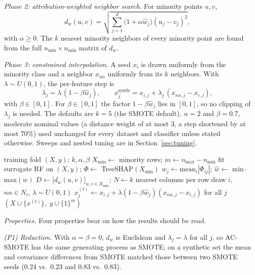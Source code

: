 \documentclass[conference,a4paper]{IEEEtran}
\newcommand{\acs}{AC-SMOTE}
\begin{document}
\textit{Phase 2: attribution-weighted neighbor search.} For minority points $u,v$,
\begin{equation}
d_w(u,v)=\sqrt{\sum_{j=1}^{d}\bigl(1+\alpha\hat{w}_j\bigr)(u_j-v_j)^2},
\end{equation}
with $\alpha\ge 0$. The $k$ nearest minority neighbors of every minority point are found from the full $n_{\min}\times n_{\min}$ matrix of $d_w$.

\textit{Phase 3: constrained interpolation.} A seed $x_i$ is drawn uniformly from the minority class and a neighbor $x_{nn}$ uniformly from its $k$ neighbors. With $\lambda\sim U(0,1)$, the per-feature step is
\begin{equation}
\lambda_j=\lambda\,(1-\beta\hat{w}_j),\qquad x^{\mathrm{synth}}_j=x_{i,j}+\lambda_j\,(x_{nn,j}-x_{i,j}),
\end{equation}
with $\beta\in[0,1]$. For $\beta\in[0,1]$ the factor $1-\beta\hat{w}_j$ lies in $[0,1]$, so no clipping of $\lambda_j$ is needed. The defaults are $k=5$ (the SMOTE default), $\alpha=2$ and $\beta=0.7$, moderate nominal values (a distance weight of at most 3, a step shortened by at most 70\%) used unchanged for every dataset and classifier unless stated otherwise. Sweeps and nested tuning are in Section~\ref{sec:tuning}.

\begin{algorithm}[t]\small
\caption{AC-SMOTE}\label{alg:acs}
\begin{algorithmic}[1]
\REQUIRE training fold $(X,y)$; $k,\alpha,\beta$
\STATE $X_{\min}\leftarrow$ minority rows; $m\leftarrow n_{\max}-n_{\min}$
\STATE fit surrogate RF on $(X,y)$; $\Phi\leftarrow$ TreeSHAP$(X_{\min})$
\STATE $w_j\leftarrow \mathrm{mean}_i|\Phi_{ij}|$; $\hat{w}\leftarrow$ min--max$(w)$
\STATE $D\leftarrow \big[d_w(u,v)\big]_{u,v\in X_{\min}}$; $N\leftarrow k$ nearest columns per row
\STATE draw $i$, $nn\in N_i$, $\lambda\sim U(0,1)$
\STATE $x^{(t)}_j\leftarrow x_{i,j}+\lambda(1-\beta\hat{w}_j)(x_{nn,j}-x_{i,j})$ for all $j$
\ENDFOR
\RETURN $(X\cup\{x^{(t)}\},\; y\cup\{1\}^m)$
\end{algorithmic}
\end{algorithm}

\textit{Properties.} Four properties bear on how the results should be read.

\emph{(P1) Reduction.} With $\alpha=\beta=0$, $d_w$ is Euclidean and $\lambda_j=\lambda$ for all $j$, so \acs{} has the same generating process as SMOTE; on a synthetic set the mean and covariance differences from SMOTE matched those between two SMOTE seeds (0.24 vs.\ 0.23 and 0.83 vs.\ 0.83).
\end{document}
